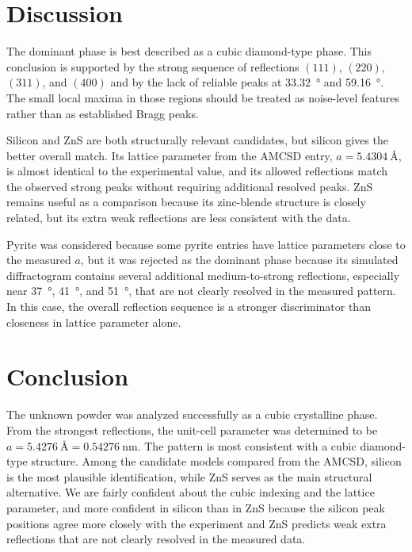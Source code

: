 \documentclass[11pt,a4paper]{article}
\begin{document}
\section{Discussion}
The dominant phase is best described as a cubic diamond-type phase. This conclusion is supported by the strong sequence of reflections $(111)$, $(220)$, $(311)$, and $(400)$ and by the lack of reliable peaks at \SI{33.32}{\degree} and \SI{59.16}{\degree}. The small local maxima in those regions should be treated as noise-level features rather than as established Bragg peaks.

Silicon and ZnS are both structurally relevant candidates, but silicon gives the better overall match. Its lattice parameter from the AMCSD entry, $a = \SI{5.4304}{\angstrom}$, is almost identical to the experimental value, and its allowed reflections match the observed strong peaks without requiring additional resolved peaks. ZnS remains useful as a comparison because its zinc-blende structure is closely related, but its extra weak reflections are less consistent with the data.

Pyrite was considered because some pyrite entries have lattice parameters close to the measured $a$, but it was rejected as the dominant phase because its simulated diffractogram contains several additional medium-to-strong reflections, especially near \SI{37}{\degree}, \SI{41}{\degree}, and \SI{51}{\degree}, that are not clearly resolved in the measured pattern. In this case, the overall reflection sequence is a stronger discriminator than closeness in lattice parameter alone.

\section{Conclusion}
The unknown powder was analyzed successfully as a cubic crystalline phase. From the strongest reflections, the unit-cell parameter was determined to be $a = \SI{5.4276}{\angstrom} = \SI{0.54276}{\nano\meter}$. The pattern is most consistent with a cubic diamond-type structure. Among the candidate models compared from the AMCSD, silicon is the most plausible identification, while ZnS serves as the main structural alternative. We are fairly confident about the cubic indexing and the lattice parameter, and more confident in silicon than in ZnS because the silicon peak positions agree more closely with the experiment and ZnS predicts weak extra reflections that are not clearly resolved in the measured data.
\end{document}
